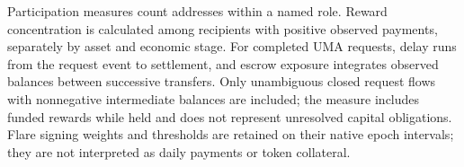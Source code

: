 Participation measures count addresses within a named role. Reward concentration is calculated among recipients with positive observed payments, separately by asset and economic stage. For completed UMA requests, delay runs from the request event to settlement, and escrow exposure integrates observed balances between successive transfers. Only unambiguous closed request flows with nonnegative intermediate balances are included; the measure includes funded rewards while held and does not represent unresolved capital obligations. Flare signing weights and thresholds are retained on their native epoch intervals; they are not interpreted as daily payments or token collateral.
